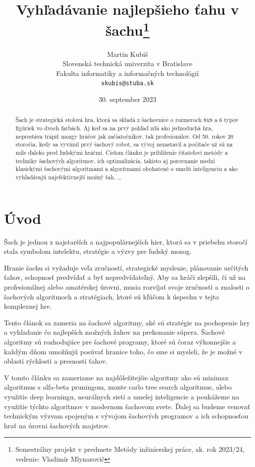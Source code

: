 \documentclass[10pt,twoside,slovak,a4paper]{article}
\title{Vyhľadávanie najlepšieho ťahu v šachu\thanks{Semestrálny projekt v predmete Metódy inžinierskej práce, ak. rok 2023/24, vedenie: Vladimír Mlynarovič}} %
\author{Martin Kubiš\\[2pt]
	{\small Slovenská technická univerzita v Bratislave}\\
	{\small Fakulta informatiky a informačných technológií}\\
	{\small \texttt{xkubis@stuba.sk}}
	}
\date{\small 30. september 2023} %
\begin{document}
\maketitle

\begin{abstract}
Šach je strategická stolová hra, ktorá sa skladá z šachovnice o rozmeroch 8x8 a 6 typov figúriek vo dvoch farbách. Aj keď sa na prvý pohľad zdá ako jednoduchá hra, neprestáva trápiť mozgy hráčov jak začiatočníkov, tak profesionálov. Od 50. rokov 20 storočia, kedy sa vyvinul prvý šachový robot, sa vývoj nezastavil a počítače už sú na míle ďaleko pred ľudskými hráčmi. Cielom článku je priblíženie čitateľovi metódy a techniky šachových algoritmov, ich optimalizácia, takisto aj porovnanie medzi klasickými šachovými algoritmami a algoritmami obohatené o umelú inteligenciu a ako vyhľadávajú najefektívnejší možný ťah.
\ldots
\end{abstract}



\section{Úvod}
Šach je jednou z najstarších a najpopulárnejších hier, ktorá sa v priebehu storočí stala symbolom intelektu, stratégie a výzvy pre ľudský mozog. 

Hranie šachu si vyžaduje veľa zručností, strategické myslenie, plánovanie určitých ťahov, schopnosť predvídať a  byť nepredvídateľný. Aby sa hráči zlepšili, či už na profesionálnej alebo amatérskej úrovni, musia rozvíjať svoje zručnosti a znalosti o šachových algoritmoch a stratégiach, ktoré sú kľúčom k úspechu v tejto komplexnej hre.

Tento článok sa zameria na šachové algoritmy, aké sú stratégie na pochopenie hry a vyhladanie čo najlepších možných žahov na prekonanie súpera. Šachové algoritmy sú rozhodujúce pre šachové programy, ktoré sú čoraz výkonnejšie a každým dňom umožňujú posúvať hranice toho, čo sme si mysleli, že je možné v oblasti rýchlosti a presnosti ťahov.

V tomto článku sa zameriame na najdôležitejšie algoritmy ako sú minimax algoritmus s alfa-beta pruningom, monte carlo tree search algoritmus, alebo využitie deep learningu, neurálnych sietí a umelej inteligencie a poukážeme na využitie týchto algoritmov v modernom šachovom svete. Ďalej sa budeme venovať technickým výzvam spojeným s vývojom šachových programov a ich schopnosťou hrať na úrovni šachových majstrov. 
\end{document}
